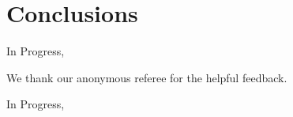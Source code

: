 \documentclass[twocolumn,prd,nofootinbib]{revtex4}
\newcommand\AddedResponse[1]{{\color{blue} {#1}}}
\newcommand\editremark[1]{{\color{red} #1}}
\newcommand{\mc}{{\cal M}}
\begin{document}


















\section{Conclusions}
\label{sec:conclude}
In Progress, 













\begin{acknowledgements}
We thank our anonymous referee for the helpful feedback.

\end{acknowledgements}


\appendix
In Progress,





\end{document}
